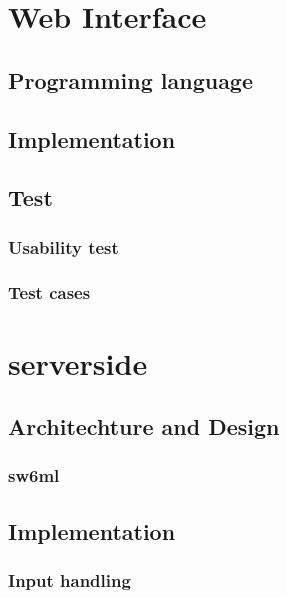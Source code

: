   \section{Web Interface}
    \label{sect:webInterface}
    
      \subsection{Programming language}
        
      \subsection{Implementation}
        
      \subsection{Test}
      \subsubsection{Usability test}
        
      \subsubsection{Test cases}
        

  \section{serverside} %
    
    \subsection{Architechture and Design}
      \label{sect:ssArchAndDesign}
	
      \subsubsection{sw6ml} %
	\label{sw6ml}
        
	  
    \subsection{Implementation}
      \subsubsection{Input handling} %
	
